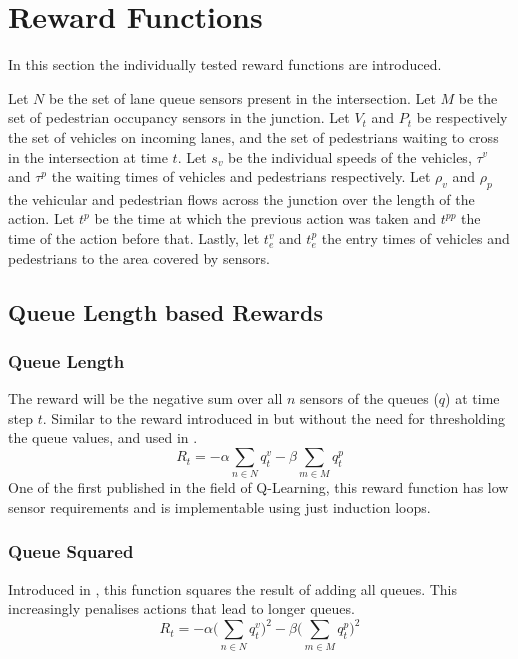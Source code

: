 \documentclass[conference]{IEEEtran}
\begin{document}
\section{Reward Functions}
In this section the individually tested reward functions are introduced.

Let $N$ be the set of lane queue sensors present in the intersection.
Let $M$ be the set of pedestrian occupancy sensors in the junction.
Let $V_t$ and $P_t$ be respectively the set of vehicles on incoming lanes, and the set of pedestrians waiting to cross in the intersection at time $t$. 
Let $s_v$ be the individual speeds of the vehicles, $\tau^v$ and $\tau^p$ the waiting times of vehicles and pedestrians respectively.
Let $\rho_v$ and $\rho_p$ the vehicular and pedestrian flows across the junction over the length of the action.
Let $t^p$ be the time at which the previous action was taken and $t^{pp}$ the time of the action before that.
Lastly, let $t^v_e$ and $t^p_e$ the entry times of vehicles and pedestrians to the area covered by sensors. 

\subsection{Queue Length based Rewards}
\subsubsection{Queue Length}
The reward will be the negative sum over all $n$ sensors of the queues ($q$) at time step $t$.
Similar to the reward introduced in \cite{prashanth2011} but without the need for thresholding the queue values, and used in \cite{aslani2019}.
\begin{equation}
    R_t = - \alpha \sum_{n \in N} q^v_{t} - \beta \sum_{m \in M} q^p_{t}
\label{eq:queue}
\end{equation}
One of the first published in the field of Q-Learning, this reward function has low sensor requirements and is implementable using just induction loops.

\subsubsection{Queue Squared}
Introduced in \cite{gendersthesis}, this function squares the result of adding all queues.
This increasingly penalises actions that lead to longer queues.
\begin{equation}
   R_t = - \alpha \bigg( \sum_{n \in N} q^v_{t} \bigg)^2 - \beta \bigg( \sum_{m \in M} q^p_{t} \bigg)^2
\label{eq:queuesq} 
\end{equation}
\end{document}
